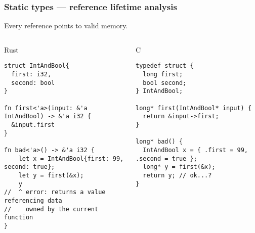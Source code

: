 \documentclass[t]{beamer}
\begin{document}
\begin{frame}[fragile]
\frametitle{Static types --- reference lifetime analysis}
\begin{comment}
Reference lifetime analysis, generally known as "borrow checking", determines at compile
time whether a program references data in a safe way.

For example, you're allowed to get a refrence to a struct's field, pass it to and return
it from functions, store it in another datatype, etc. and the compiler will prevent you
from doing anything that could cause the reference to outlive the struct. In other words,
no dangling references / use-after-frees.
\end{comment}

Every reference points to valid memory.

\begin{columns}

\begin{column}[T]{0.48\textwidth}
\begin{block}{Rust}
\tiny
\begin{verbatim}
struct IntAndBool{
  first: i32,
  second: bool
}

fn first<'a>(input: &'a IntAndBool) -> &'a i32 {
  &input.first
}

fn bad<'a>() -> &'a i32 {
    let x = IntAndBool{first: 99, second: true};
    let y = first(&x);
    y
//  ^ error: returns a value referencing data
//    owned by the current function
}
\end{verbatim}
\end{block}
\end{column}

\begin{column}[T]{0.48\textwidth}
\begin{block}{C}
\tiny
\begin{verbatim}
typedef struct {
  long first;
  bool second;
} IntAndBool;

long* first(IntAndBool* input) {
  return &input->first;
}

long* bad() {
  IntAndBool x = { .first = 99, .second = true };
  long* y = first(&x);
  return y; // ok...? 
}
\end{verbatim}
\end{block}
\end{column}

\end{columns}

\end{frame}
\end{document}
